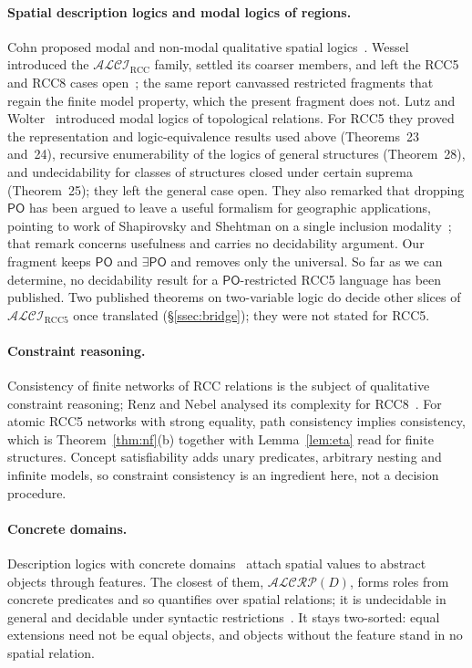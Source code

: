 \documentclass[11pt]{article}
\newcommand{\ALCIRCC}[1]{\mathcal{ALCI}_{\mathrm{RCC#1}}}
\newcommand{\PO}{\mathsf{PO}}
\theoremstyle{plain}
\theoremstyle{definition}
\begin{document}
\paragraph{Spatial description logics and modal logics of regions.} Cohn
proposed modal and non-modal qualitative spatial logics~\cite{Cohn1993}. Wessel
introduced the $\mathcal{ALCI}_{\mathrm{RCC}}$ family, settled its coarser members,
and left the RCC5 and RCC8 cases open~\cite{Wessel2003}; the same report
canvassed restricted fragments that regain the finite model property, which the
present fragment does not. Lutz and Wolter~\cite{LutzWolter2006} introduced modal
logics of topological relations. For RCC5 they proved the representation and
logic-equivalence results used above (Theorems~23 and~24), recursive
enumerability of the logics of general structures (Theorem~28), and
undecidability for classes of structures closed under certain suprema
(Theorem~25); they left the general case open. They also remarked that dropping
$\PO$ has been argued to leave a useful formalism for geographic applications,
pointing to work of Shapirovsky and Shehtman on a single inclusion
modality~\cite{ShapirovskyShehtman2005}; that remark concerns usefulness and
carries no decidability argument. Our fragment keeps $\PO$ and $\exists\PO$ and
removes only the universal. So far as we can determine, no decidability result
for a $\PO$-restricted RCC5 language has been published. Two published theorems
on two-variable logic do decide other slices of $\ALCIRCC{5}$ once translated
(\S\ref{ssec:bridge}); they were not stated for RCC5.

\paragraph{Constraint reasoning.} Consistency of finite networks of RCC
relations is the subject of qualitative constraint reasoning; Renz and Nebel
analysed its complexity for RCC8~\cite{RenzNebel1999}. For atomic RCC5 networks
with strong equality, path consistency implies consistency, which is
Theorem~\ref{thm:nf}(b) together with Lemma~\ref{lem:eta} read for finite
structures. Concept satisfiability adds
unary predicates, arbitrary nesting and infinite models, so constraint
consistency is an ingredient here, not a decision procedure.

\paragraph{Concrete domains.} Description logics with concrete
domains~\cite{LutzMilicic2007,BaaderRydval2020} attach spatial values to abstract
objects through features. The closest of them, $\mathcal{ALCRP}(D)$, forms roles
from concrete predicates and so quantifies over spatial relations; it is
undecidable in general and decidable under syntactic
restrictions~\cite{HaarslevLutzMoeller1999}. It stays two-sorted: equal extensions
need not be equal objects, and objects without the feature stand in no spatial
relation.
\end{document}
